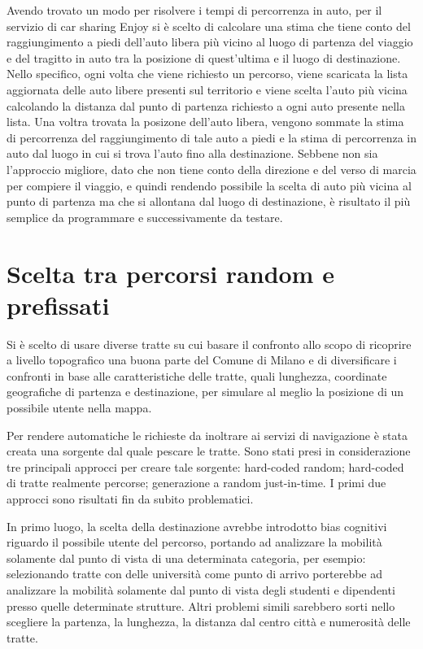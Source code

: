 Avendo trovato un modo per risolvere i tempi di percorrenza in auto, per il servizio di car sharing Enjoy si è scelto di calcolare una stima che tiene conto del raggiungimento a piedi dell'auto libera più vicino al luogo di partenza del viaggio e del tragitto in auto tra la posizione di quest'ultima e il luogo di destinazione. Nello specifico, ogni volta che viene richiesto un percorso, viene scaricata la lista aggiornata delle auto libere presenti sul territorio e viene scelta l'auto più vicina calcolando la distanza dal punto di partenza richiesto a ogni auto presente nella lista. Una voltra trovata la posizone dell'auto libera, vengono sommate la stima di percorrenza del raggiungimento di tale auto a piedi e la stima di percorrenza in auto dal luogo in cui si trova l'auto fino alla destinazione. Sebbene non sia l'approccio migliore, dato che non tiene conto della direzione e del verso di marcia per compiere il viaggio, e quindi rendendo possibile la scelta di auto più vicina al punto di partenza ma che si allontana dal luogo di destinazione, è risultato il più semplice da programmare e successivamente da testare.

\section{Scelta tra percorsi random e prefissati}

Si è scelto di usare diverse tratte su cui basare il confronto allo scopo di ricoprire a livello topografico una buona parte del Comune di Milano e di diversificare i confronti in base alle caratteristiche delle tratte, quali lunghezza, coordinate geografiche di partenza e destinazione, per simulare al meglio la posizione di un possibile utente nella mappa.

Per rendere automatiche le richieste da inoltrare ai servizi di navigazione è stata creata una sorgente dal quale pescare le tratte. Sono stati presi in considerazione tre principali approcci per creare tale sorgente: hard-coded random; hard-coded di tratte realmente percorse; generazione a random just-in-time. I primi due approcci sono risultati fin da subito problematici.

In primo luogo, la scelta della destinazione avrebbe introdotto bias cognitivi riguardo il possibile utente del percorso, portando ad analizzare la mobilità solamente dal punto di vista di una determinata categoria, per esempio: selezionando tratte con delle università come punto di arrivo porterebbe ad analizzare la mobilità solamente dal punto di vista degli studenti e dipendenti presso quelle determinate strutture. Altri problemi simili sarebbero sorti nello scegliere la partenza, la lunghezza, la distanza dal centro città e numerosità delle tratte.

